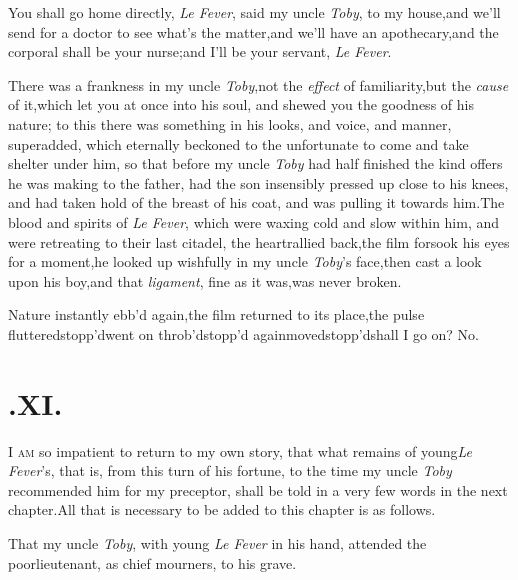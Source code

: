 \documentclass{article}
\begin{document}
\tsh You shall go home directly, \textit{Le Fever}, said
my uncle \textit{Toby}, to my house,\break\tsk and we’ll send for a
doctor to see what’s the matter,\tsk and we’ll have
an apothecary,\tsk and the corporal shall be your
nurse;\tsh and I’ll be your servant, \textit{Le
Fever}.

There was a frankness in my uncle \textit{Toby},\tsk not the
\textit{effect} of familiarity,\tsk but the \textit{cause} of
it,\tsk which let you at once into his soul, and shewed you the
goodness of his nature; to this there was something in his looks,
and voice, and manner, superadded, which eternally beckoned to the
unfortunate to come and take shelter under him, so that before my
uncle \textit{Toby} had half finished the kind offers he was making
to the father, had the son insensibly pressed up close to his
knees, and had taken hold of the breast of his coat, and was
pulling it towards him.\tsh The blood and spirits of \textit{Le
Fever}, which were waxing cold and slow within him, and were
retreating to their last citadel, the heart\tsk rallied
back,\tsk the film forsook his eyes for a moment,\tsk he looked
up wishfully in my uncle \textit{Toby}’s face,\tsk then cast
a look upon his boy,\tsh and that \textit{ligament}, fine as
it was,\tsk was never broken.\tsh

Nature instantly ebb’d again,\tsk the film returned to
its place,\tsh the pulse
fluttered\tsh stopp’d\tsh went on\tsh\break
\tsh throb’d\tsh stopp’d again\tsh moved\tsh stopp’d\tsh shall
I go on?\tsh\break
No.

\section{.\enspace XI.}

\lettrine{I}{ am} so impatient to return to my own
story, that what remains of young\break\textit{Le Fever}’s, that is,
from this turn of his fortune, to the time my uncle \textit{Toby}
recommended him for my preceptor, shall be told in a very few words
in the next chapter.\tsk All that is necessary to be added to
this chapter is as follows.\tsk 

That my uncle \textit{Toby}, with young \textit{Le Fever} in his
hand, attended the poor\break lieutenant, as chief mourners, to his\break
grave.
\end{document}
